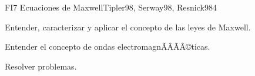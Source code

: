 \begin{sumilla}
\begin{unit}{FI7 Ecuaciones de Maxwell}{Tipler98, Serway98, Resnick98}{4}
   \begin{objetivos}
         \item  Entender, caracterizar y aplicar el concepto de las leyes de Maxwell.
         \item  Entender el concepto de ondas electromagnÃÂÃÂ©ticas.
         \item  Resolver problemas.
   \end{objetivos}
\end{unit}

\begin{bibliografia}
\end{bibliografia}

\end{sumilla}